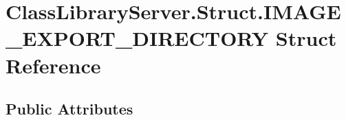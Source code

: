 \hypertarget{struct_class_library_server_1_1_struct_1_1_i_m_a_g_e___e_x_p_o_r_t___d_i_r_e_c_t_o_r_y}{}\section{Class\+Library\+Server.\+Struct.\+I\+M\+A\+G\+E\+\_\+\+E\+X\+P\+O\+R\+T\+\_\+\+D\+I\+R\+E\+C\+T\+O\+RY Struct Reference}
\label{struct_class_library_server_1_1_struct_1_1_i_m_a_g_e___e_x_p_o_r_t___d_i_r_e_c_t_o_r_y}
\subsection*{Public Attributes}
